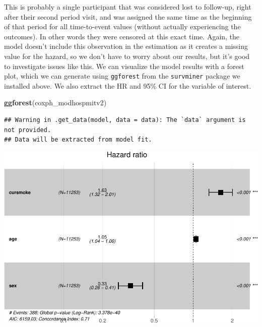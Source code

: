 \documentclass[
]{book}
\newenvironment{Shaded}{\begin{snugshade}}{\end{snugshade}}
\newcommand{\KeywordTok}[1]{\textcolor[rgb]{0.13,0.29,0.53}{\textbf{#1}}}
\newcommand{\NormalTok}[1]{#1}
\begin{document}
This is probably a single participant that was considered lost to follow-up, right after their second period visit, and was assigned the same time as the beginning of that period for all time-to-event values (without actually experiencing the outcomes). In other words they were censored at this exact time. Again, the model doesn't include this observation in the estimation as it creates a missing value for the hazard, so we don't have to worry about our results, but it's good to investigate issues like this. We can visualize the model results with a forest plot, which we can generate using \texttt{ggforest} from the \texttt{survminer} package we installed above. We also extract the HR and 95\% CI for the variable of interest.

\begin{Shaded}
\begin{Highlighting}[]
\KeywordTok{ggforest}\NormalTok{(coxph_modhospmitv2)}
\end{Highlighting}
\end{Shaded}

\begin{verbatim}
## Warning in .get_data(model, data = data): The `data` argument is not provided.
## Data will be extracted from model fit.
\end{verbatim}

\includegraphics{adv_epi_analysis_files/figure-latex/unnamed-chunk-229-1.pdf}
\end{document}
